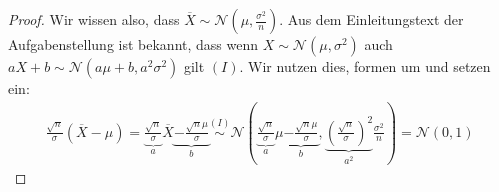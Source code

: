 \documentclass[a4paper]{scrartcl}
\def \blattnr {7}
\begin{document}
\begin{enumerate}[label=\bfseries \blattnr.\arabic*]
\begin{enumerate}
\begin{proof}
                Wir wissen also, dass $\overline{X} \sim \mathcal{N}(\mu,
                \frac{\sigma^2}n)$. 
                Aus dem Einleitungstext der Aufgabenstellung ist bekannt, dass 
                wenn $X \sim \mathcal{N}(\mu,\sigma^2)$ auch $aX+b \sim
                \mathcal{N}(a\mu+b,a^2\sigma^2)$ gilt $(I)$.
                Wir nutzen dies, formen um und setzen ein:
                \begin{equation*}
                    \begin{split}
                        \frac{\sqrt{n}}\sigma \left( \overline{X} - \mu \right)
                        = \underbrace{\frac{\sqrt{n}}\sigma}_{a} \overline{X} \underbrace{- \frac{\sqrt{n} \mu}\sigma}_{b}
                        \stackrel{(I)}{\sim} \mathcal{N}\left( \underbrace{\frac{\sqrt{n}}\sigma}_{a} \mu \underbrace{- \frac{\sqrt{n} \mu}\sigma}_{b}, 
                            \underbrace{\left(\frac{\sqrt{n}}\sigma \right)^2}_{a^2} \frac{\sigma^2}n \right) 
                        =\mathcal{N}(0,1)
                    \end{split}
                \end{equation*}
            \end{proof}

        \end{enumerate}

\end{enumerate}
\end{document}
